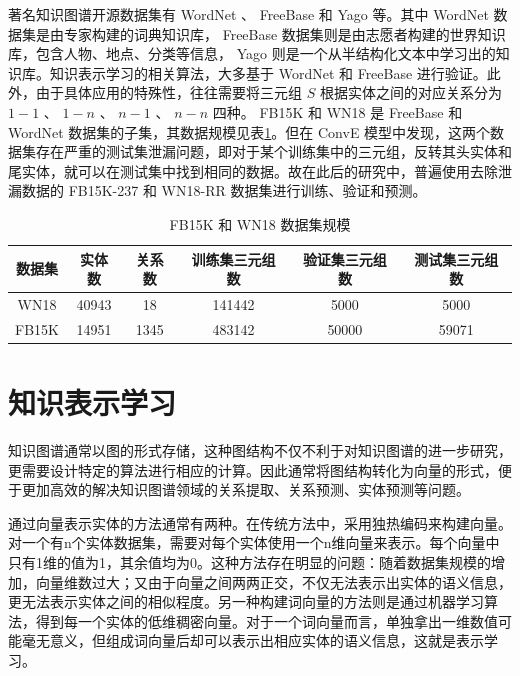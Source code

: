 \documentclass{llncs}
\begin{document}
著名知识图谱开源数据集有 WordNet 、 FreeBase 和 Yago 等。其中 WordNet 数据集是由专家构建的词典知识库， FreeBase 数据集则是由志愿者构建的世界知识库，包含人物、地点、分类等信息， Yago 则是一个从半结构化文本中学习出的知识库。知识表示学习的相关算法，大多基于 WordNet 和 FreeBase 进行验证。此外，由于具体应用的特殊性，往往需要将三元组 $S$ 根据实体之间的对应关系分为 $1-1$ 、 $1-n$ 、 $n-1$ 、 $n-n$ 四种。 FB15K 和 WN18 \cite{DBLP:conf/nips/BordesUGWY13}是 FreeBase 和 WordNet 数据集的子集，其数据规模见表\ref{tb:FB15K&WN18}。但在 ConvE 模型\cite{DBLP:conf/aaai/DettmersMS018}中发现，这两个数据集存在严重的测试集泄漏问题，即对于某个训练集中的三元组，反转其头实体和尾实体，就可以在测试集中找到相同的数据。故在此后的研究中，普遍使用去除泄漏数据的 FB15K-237 和 WN18-RR 数据集进行训练、验证和预测。

\begin{table}
	\centering
	\caption{ FB15K 和 WN18 数据集规模}
	\label{tb:FB15K&WN18}
	\begin{threeparttable}
		\begin{tabular}{cccccc}
			\hline
			\textbf{数据集} & \textbf{实体数} & \textbf{关系数} & \textbf{训练集三元组数} & \textbf{验证集三元组数} & \textbf{测试集三元组数} \\ \hline
			WN18 & 40943 & 18 & 141442 & 5000 & 5000 \\
			FB15K & 14951 & 1345 & 483142 & 50000 & 59071 \\ \hline
		\end{tabular}
	\end{threeparttable}
\end{table}

\section{知识表示学习}

知识图谱通常以图的形式存储，这种图结构不仅不利于对知识图谱的进一步研究，更需要设计特定的算法进行相应的计算。因此通常将图结构转化为向量的形式，便于更加高效的解决知识图谱领域的关系提取、关系预测、实体预测等问题。

通过向量表示实体的方法通常有两种。在传统方法中，采用独热编码来构建向量。对一个有n个实体数据集，需要对每个实体使用一个n维向量来表示。每个向量中只有1维的值为1，其余值均为0。这种方法存在明显的问题：随着数据集规模的增加，向量维数过大；又由于向量之间两两正交，不仅无法表示出实体的语义信息，更无法表示实体之间的相似程度。另一种构建词向量的方法则是通过机器学习算法，得到每一个实体的低维稠密向量。对于一个词向量而言，单独拿出一维数值可能毫无意义，但组成词向量后却可以表示出相应实体的语义信息，这就是表示学习。
\end{document}
